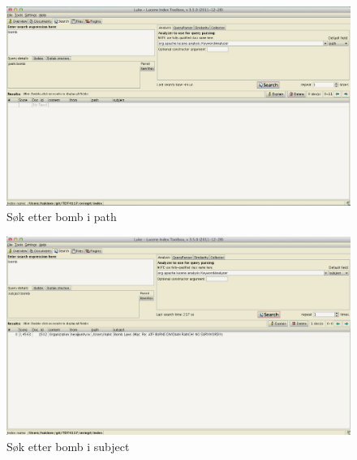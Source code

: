 \begin{figure}[p]
\centering
\includegraphics[scale=0.31]{images/bombpath.png}
\caption{Søk etter bomb i path}
\end{figure}

\begin{figure}[p]
\centering
\includegraphics[scale=0.31]{images/bombsubject.png}
\caption{Søk etter bomb i subject}
\end{figure}
